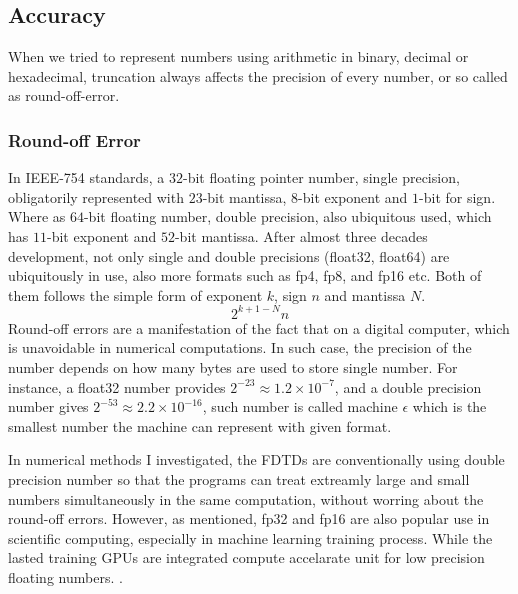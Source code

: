  


\subsection{Accuracy}
When we tried to represent numbers using arithmetic in binary, decimal or hexadecimal, truncation always affects the precision of every number, 
or so called as 
round-off-error.

\subsubsection{Round-off Error}
In IEEE-754 \cite{IEEE_754} standards, a $32$-bit floating pointer number, single precision, obligatorily represented with $23$-bit mantissa, 
$8$-bit exponent and $1$-bit for sign. 
Where as $64$-bit floating number, double precision, also ubiquitous used, which has $11$-bit exponent and $52$-bit mantissa.
After almost three decades development, not only single and double precisions (float32, float64) are ubiquitously in use, 
also more formats such as fp4, fp8, and fp16 etc. Both of them follows the simple form of exponent $k$, sign $n$ and mantissa $N$. 
\cite{IEEE_754_p2_eq1}
\begin{equation*}
  2^{k+1-N}n
\end{equation*}
Round-off errors are a manifestation of the fact that on a digital computer, which is unavoidable in numerical computations.
In such case, the precision of the number depends on how many bytes are used to store single number. 
For instance, a float32 number provides $2^{-23} \approx 1.2\times10^{-7}$, and a double precision number gives $2^{-53} \approx 2.2\times10^{-16}$, 
such number is called machine $\epsilon$ which is the smallest number the machine can represent with given format.

In numerical methods I investigated, the FDTDs are conventionally using double precision number so that the programs can treat extreamly large and small 
numbers simultaneously in the same computation, without worring about the round-off errors.
However, as mentioned, fp32 and fp16 are also popular use in scientific computing, especially in machine learning training process. 
While the lasted training GPUs are integrated compute accelarate unit for low precision floating numbers. \cite{NVIDIA_HB200_PAPER}.

